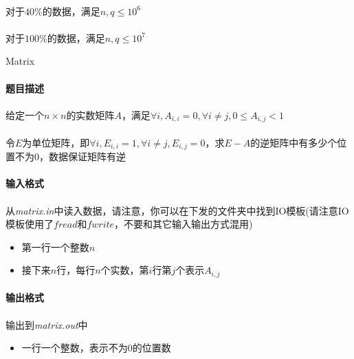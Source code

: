 \documentclass[UTF8]{ctexart}
\begin{document}
\paragraph{}对于$40\%$的数据，满足$n,q\le 10^6$
\paragraph{}对于$100\%$的数据，满足$n,q\le 10^7$

\clearpage

\begin{center}
	\large{Matrix}
\end{center}
\paragraph{题目描述}
\paragraph{}给定一个$n\times n$的实数矩阵$A$，满足$\forall i,A_{i,i}=0,\forall i\not=j,0\leq A_{i,j}<1$
\paragraph{}令$E$为单位矩阵，即$\forall i,E_{i,i}=1,\forall i\not=j,E_{i,j}=0$，求$E-A$的逆矩阵中有多少个位置不为0，数据保证矩阵有逆
\paragraph{输入格式}
\paragraph{}从\emph{matrix.in}中读入数据，请注意，你可以在下发的文件夹中找到IO模板(请注意IO模板使用了$fread$和$fwrite$，不要和其它输入输出方式混用)
\begin{itemize}
\item 第一行一个整数$n$
\item 接下来$n$行，每行$n$个实数，第$i$行第$j$个表示$A_{i,j}$
\end{itemize}
\paragraph{输出格式}
\paragraph{}输出到\emph{matrix.out}中
\begin{itemize}
	\item 一行一个整数，表示不为0的位置数
\end{itemize}
\end{document}
